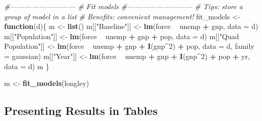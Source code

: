\documentclass[11pt,]{article}
\newenvironment{Shaded}{\begin{snugshade}}{\end{snugshade}}
\newcommand{\KeywordTok}[1]{\textcolor[rgb]{0.13,0.29,0.53}{\textbf{#1}}}
\newcommand{\DataTypeTok}[1]{\textcolor[rgb]{0.13,0.29,0.53}{#1}}
\newcommand{\DecValTok}[1]{\textcolor[rgb]{0.00,0.00,0.81}{#1}}
\newcommand{\StringTok}[1]{\textcolor[rgb]{0.31,0.60,0.02}{#1}}
\newcommand{\CommentTok}[1]{\textcolor[rgb]{0.56,0.35,0.01}{\textit{#1}}}
\newcommand{\ControlFlowTok}[1]{\textcolor[rgb]{0.13,0.29,0.53}{\textbf{#1}}}
\newcommand{\OperatorTok}[1]{\textcolor[rgb]{0.81,0.36,0.00}{\textbf{#1}}}
\newcommand{\NormalTok}[1]{#1}
\begin{document}
\begin{Shaded}
\begin{Highlighting}[]
\CommentTok{#---------------------------}
\CommentTok{# Fit models}
\CommentTok{#---------------------------}
  \CommentTok{# Tips: store a group of model in a list}
  \CommentTok{# Benefits: convenient management! }
\NormalTok{  fit_models <-}\StringTok{ }\ControlFlowTok{function}\NormalTok{(d)\{}
\NormalTok{    m <-}\StringTok{ }\KeywordTok{list}\NormalTok{()}
\NormalTok{    m[[}\StringTok{"Baseline"}\NormalTok{]] <-}\StringTok{ }\KeywordTok{lm}\NormalTok{(force }\OperatorTok{~}\StringTok{ }\NormalTok{unemp }\OperatorTok{+}\StringTok{ }\NormalTok{gnp, }\DataTypeTok{data =}\NormalTok{ d)}
\NormalTok{    m[[}\StringTok{"Population"}\NormalTok{]] <-}\StringTok{ }\KeywordTok{lm}\NormalTok{(force }\OperatorTok{~}\StringTok{ }\NormalTok{unemp }\OperatorTok{+}\StringTok{ }\NormalTok{gnp }\OperatorTok{+}\StringTok{ }\NormalTok{pop, }\DataTypeTok{data =}\NormalTok{ d)}
\NormalTok{    m[[}\StringTok{"Quad Population"}\NormalTok{]] <-}\StringTok{ }\KeywordTok{lm}\NormalTok{(force }\OperatorTok{~}\StringTok{ }\NormalTok{unemp }\OperatorTok{+}\StringTok{ }\NormalTok{gnp }\OperatorTok{+}\StringTok{ }\KeywordTok{I}\NormalTok{(gnp}\OperatorTok{^}\DecValTok{2}\NormalTok{) }\OperatorTok{+}\StringTok{ }\NormalTok{pop, }\DataTypeTok{data =}\NormalTok{ d, }
                                  \DataTypeTok{family =}\NormalTok{ gaussian)}
\NormalTok{    m[[}\StringTok{"Year"}\NormalTok{]] <-}\StringTok{ }\KeywordTok{lm}\NormalTok{(force }\OperatorTok{~}\StringTok{ }\NormalTok{unemp }\OperatorTok{+}\StringTok{ }\NormalTok{gnp }\OperatorTok{+}\StringTok{ }\KeywordTok{I}\NormalTok{(gnp}\OperatorTok{^}\DecValTok{2}\NormalTok{) }\OperatorTok{+}\StringTok{ }\NormalTok{pop }\OperatorTok{+}\StringTok{ }\NormalTok{yr, }\DataTypeTok{data =}\NormalTok{ d)}
\NormalTok{    m}
\NormalTok{  \}}

\NormalTok{  m <-}\StringTok{ }\KeywordTok{fit_models}\NormalTok{(longley)}
\end{Highlighting}
\end{Shaded}

\normalsize

\subsection{Presenting Results in
Tables}\label{presenting-results-in-tables}

\tiny
\end{document}
